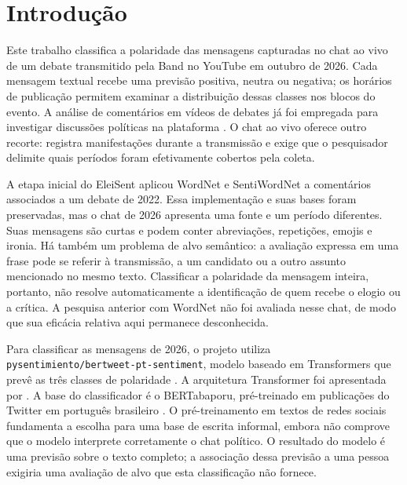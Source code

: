 
\chapter{Introdução}

Este trabalho classifica a polaridade das mensagens capturadas no chat ao vivo de um debate transmitido pela Band no YouTube em outubro de 2026. Cada mensagem textual recebe uma previsão positiva, neutra ou negativa; os horários de publicação permitem examinar a distribuição dessas classes nos blocos do evento. A análise de comentários em vídeos de debates já foi empregada para investigar discussões políticas na plataforma \cite{Eaton2024}. O chat ao vivo oferece outro recorte: registra manifestações durante a transmissão e exige que o pesquisador delimite quais períodos foram efetivamente cobertos pela coleta.

A etapa inicial do EleiSent aplicou WordNet e SentiWordNet a comentários associados a um debate de 2022. Essa implementação e suas bases foram preservadas, mas o chat de 2026 apresenta uma fonte e um período diferentes. Suas mensagens são curtas e podem conter abreviações, repetições, emojis e ironia. Há também um problema de alvo semântico: a avaliação expressa em uma frase pode se referir à transmissão, a um candidato ou a outro assunto mencionado no mesmo texto. Classificar a polaridade da mensagem inteira, portanto, não resolve automaticamente a identificação de quem recebe o elogio ou a crítica. A pesquisa anterior com WordNet não foi avaliada nesse chat, de modo que sua eficácia relativa aqui permanece desconhecida.

Para classificar as mensagens de 2026, o projeto utiliza \texttt{pysentimiento/bertweet-pt-sentiment}, modelo baseado em Transformers que prevê as três classes de polaridade \cite{PysentimientoBertweetPT}. A arquitetura Transformer foi apresentada por . A base do classificador é o BERTabaporu, pré-treinado em publicações do Twitter em português brasileiro \cite{Costa2023}. O pré-treinamento em textos de redes sociais fundamenta a escolha para uma base de escrita informal, embora não comprove que o modelo interprete corretamente o chat político. O resultado do modelo é uma previsão sobre o texto completo; a associação dessa previsão a uma pessoa exigiria uma avaliação de alvo que esta classificação não fornece.

